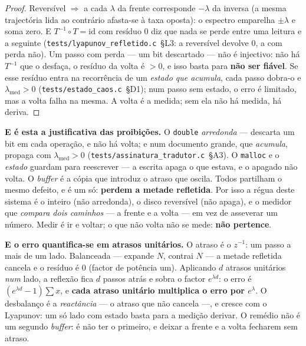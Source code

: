 \documentclass[11pt,a4paper]{article}
\newcommand{\code}[1]{\texttt{\small #1}}
\begin{document}
\begin{proof}
Reversível $\Rightarrow$ a cada $\lambda$ da frente corresponde $-\lambda$ da inversa (a mesma
trajectória lida ao contrário afasta-se à taxa oposta): o espectro emparelha $\pm\lambda$ e soma zero.
E $T^{-1}\circ T=\mathrm{id}$ com resíduo $0$ diz que nada se perde entre uma leitura e a seguinte
(\code{tests/lyapunov\_refletido.c}~§L3: a reversível devolve $0$, a com perda não). Um passo com perda
--- um bit descartado --- não é injectivo: não há $T^{-1}$ que o desfaça, o resíduo da volta é $>0$, e
isso basta para \textbf{não ser fiável}. Se esse resíduo entra na recorrência de um \emph{estado que
acumula}, cada passo dobra-o e $\lambda_{\text{med}}>0$ (\code{tests/estado\_caos.c}~§D1); num passo
sem estado, o erro é limitado, mas a volta falha na mesma. A volta é a medida; sem ela não há medida,
há deriva.
\end{proof}

\noindent \textbf{E é esta a justificativa das proibições.} O \code{double} \emph{arredonda} ---
descarta um bit em cada operação, e não há volta; e num documento grande, que \emph{acumula}, propaga
com $\lambda_{\text{med}}>0$ (\code{tests/assinatura\_tradutor.c}~§A3). O \code{malloc} e
o \emph{estado} guardam para reescrever --- a escrita apaga o que estava, e o apagado não volta. O
\emph{buffer} é a cópia que introduz o atraso que oscila. Todos partilham o mesmo defeito, e é um só:
\textbf{perdem a metade refletida}. Por isso a régua deste sistema é o inteiro (não arredonda), o
disco reversível (não apaga), e o medidor que \emph{compara dois caminhos} --- a frente e a volta ---
em vez de asseverar um número. Medir é ir e voltar; o que não volta não se mede: \textbf{não pertence}.

\smallskip
\noindent \textbf{E o erro quantifica-se em atrasos unitários.} O atraso é o $z^{-1}$: um passo a mais
de um lado. Balanceada --- expande $N$, contrai $N$ --- a metade refletida cancela e o resíduo é $0$
(factor de potência um). Aplicando $d$ atrasos unitários \emph{num} lado, a reflexão fica $d$ passos
atrás e sobra o factor $e^{\lambda d}$: o erro é $(e^{\lambda d}-1)\sum x$, e \textbf{cada atraso
unitário multiplica o erro por $e^\lambda$}. O desbalanço é a \emph{reactância} --- o atraso que não
cancela ---, e cresce com o Lyapunov: um só lado com estado basta para a medição derivar. O remédio
não é um segundo \emph{buffer}: é não ter o primeiro, e deixar a frente e a volta fecharem sem atraso.
\end{document}

